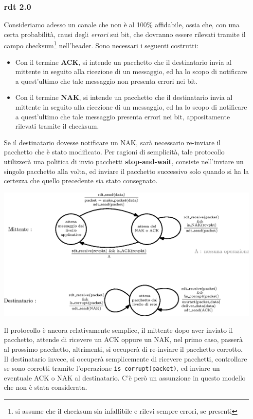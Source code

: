 \documentclass[12pt, letterpaper]{article}
\newcommand{\code}[1]{\colorbox{light-gray}{\texttt{#1}}}
\begin{document}
\subsubsection{rdt 2.0}
Consideriamo adesso un canale che non è al 100\% affidabile, ossia che, con una certa probabilità, 
causi degli \textit{errori} sui bit, che dovranno essere rilevati tramite il campo checksum\footnote{
    si assume che il checksum sia infallibile e rilevi sempre errori, se presenti
} nell'header.
Sono necessari i seguenti costrutti: 
\begin{itemize}
    \item Con il termine \textbf{ACK}, si intende un pacchetto che il destinatario invia al mittente in seguito 
    alla ricezione di un messaggio, ed ha lo 
    scopo di notificare a quest'ultimo che tale messaggio non presenta errori nei bit.
    \item Con il termine \textbf{NAK}, si intende un pacchetto che il destinatario invia al mittente in seguito 
    alla ricezione di un messaggio, ed ha lo 
    scopo di notificare a quest'ultimo che tale messaggio presenta errori nei bit, appositamente rilevati 
    tramite il checksum.
\end{itemize}
Se il destinatario dovesse notificare un NAK, sarà necessario re-inviare il pacchetto che è stato modificato. 
Per ragioni di semplicità, tale protocollo utilizzerà una politica di invio pacchetti \textbf{stop-and-wait}, 
consiste nell'inviare un singolo pacchetto alla volta, ed inviare il pacchetto successivo solo quando 
si ha la certezza che quello precedente sia stato consegnato.\begin{center}
    \includegraphics[width=1\textwidth ]{images/rdt2.0.eps}
\end{center}
Il protocollo è ancora relativamente semplice, il mittente dopo aver inviato il pacchetto, attende di ricevere un 
ACK oppure un NAK, nel primo caso, passerà al prossimo pacchetto, altrimenti, si occuperà di re-inviare il pacchetto 
corrotto. Il destinatario invece, si occuperà semplicemente di ricevere pacchetti, controllare se sono corrotti tramite 
l'operazione \code{is\_corrupt(packet)}, ed inviare un eventuale ACK o NAK al destinatario. 
C'è però un assunzione in questo modello che non è stata considerata.
\end{document}
